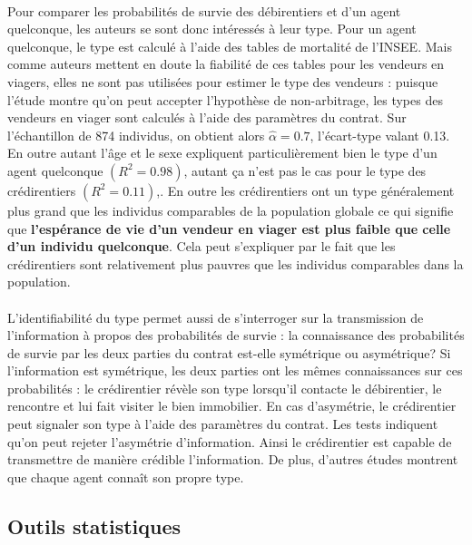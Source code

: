 \documentclass[12pt,a4paper]{article}
\begin{document}
\paragraph{}

Pour comparer les probabilités de survie des débirentiers et d’un agent quelconque, les auteurs se sont donc intéressés à leur type. Pour un agent quelconque, le type est calculé à l’aide des tables de mortalité de l’INSEE. Mais comme auteurs mettent en doute la fiabilité de ces tables pour les vendeurs en viagers, elles ne sont pas utilisées pour estimer le type des vendeurs : puisque l’étude montre qu’on peut accepter l’hypothèse de non-arbitrage, les types des vendeurs en viager sont calculés à l’aide des paramètres du contrat. Sur l’échantillon de 874 individus, on obtient alors $\hat{\alpha}=0.7$, l’écart-type valant 0.13. En outre autant l’âge et le sexe expliquent particulièrement bien le type d’un agent quelconque $\left(R^{2}=0.98\right)$, autant ça n’est pas le cas pour le type des crédirentiers $\left(R^{2}=0.11\right)$,. En outre les crédirentiers ont un type généralement plus grand que les individus comparables de la population globale ce qui signifie que \textbf{l’espérance de vie d’un vendeur en viager est plus faible que celle d’un individu quelconque}. Cela peut s’expliquer par le fait que les crédirentiers sont relativement plus pauvres que les individus comparables dans la population.

\paragraph{}

L’identifiabilité du type permet aussi de s’interroger sur la transmission de l’information à propos des probabilités de survie : la connaissance des probabilités de survie par les deux parties du contrat est-elle symétrique ou asymétrique? Si l’information est symétrique, les deux parties ont les mêmes connaissances sur ces probabilités : le crédirentier révèle son type lorsqu’il contacte le débirentier, le rencontre et lui fait visiter le bien immobilier. En cas d’asymétrie, le crédirentier peut signaler son type à l’aide des paramètres du contrat. Les tests indiquent qu’on peut rejeter l’asymétrie d’information. Ainsi le crédirentier est capable de transmettre de manière crédible l’information. De plus, d’autres études montrent que chaque agent connaît son propre type.

\subsection{Outils statistiques}
\end{document}
